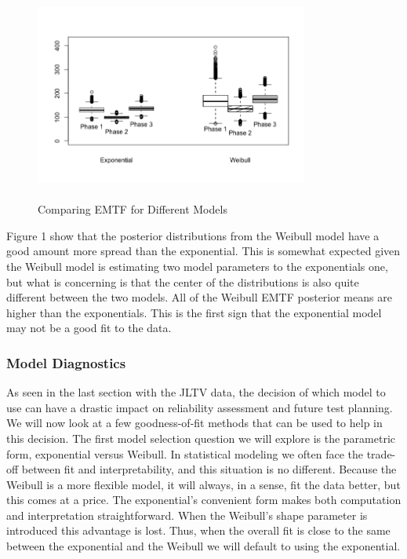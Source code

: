 \documentclass[12pt]{article}
\begin{document}
\begin{figure}[h]
  \centering
      \includegraphics[width=9cm, height=7cm]{Boxplots}
  \caption{Comparing EMTF for Different Models}
\end{figure}

Figure 1 show that the posterior distributions from the Weibull model have a
good amount more spread than the exponential.  This is somewhat expected given
the Weibull model is estimating two model parameters to the exponentials one,
but what is concerning is that the center of the distributions is also quite
different between the two models.  All of the Weibull EMTF posterior means
are higher than the exponentials.  This is the first sign that the exponential
model may not be a good fit to the data.

\subsubsection{Model Diagnostics}
As seen in the last section with the JLTV data, the decision of which model to
use can have a drastic impact on reliability assessment and future test
planning.  We will now look at a few  goodness-of-fit methods that can be used
to help in this decision.  The first model selection question we will explore is
the parametric form, exponential versus Weibull.  In statistical modeling we
often face the trade-off between fit and interpretability, and this situation is
no different. Because the Weibull is a more flexible model, it will always, in a
sense, fit the data better, but this comes at a price.  The exponential's
convenient form makes both computation and interpretation straightforward.  When
the Weibull's shape parameter is introduced this advantage is lost.  Thus, when
the overall fit is close to the same between the exponential and the Weibull we
will default to using the exponential.
\end{document}
